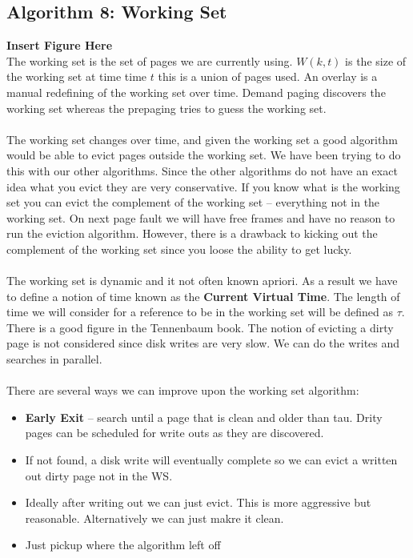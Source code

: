 \documentclass[../base_file/cs1550_notes.tex]{subfiles}
\begin{document}
\subsection{Algorithm 8: Working Set}
\textbf{Insert Figure Here}\\
The working set is the set of pages we are currently using.  $W(k,t)$ is the size of the working set at time time $t$ this is a union of pages
used.  An overlay is a manual redefining of the working set over time.  Demand paging discovers the working set whereas the prepaging tries to
guess the working set.\\\\
The working set changes over time, and given the working set a good algorithm would be able to evict pages outside the working set.  We have
been trying to do this with our other algorithms.  Since the other algorithms do not have an exact idea what you evict they are very conservative.
If you know what is the working set you can evict the complement of the working set -- everything not in the working set.  On next page fault
we will have free frames and have no reason to run the eviction algorithm.  However, there is a drawback to kicking out the complement of the
working set since you loose the ability to get lucky.\\\\
The working set is dynamic and it not often known apriori.  As a result we have to define a notion of time known as the \textbf{Current Virtual
Time}.  The length of time we will consider for a reference to be in the working set will be defined as $\tau$.  There is a good figure in the
Tennenbaum book.
The notion of evicting a dirty page is not considered since disk writes are very slow.  We can do the writes and searches in parallel.\\\\
There are several ways we can improve upon the working set algorithm:
\begin{itemize}
	\item \textbf{Early Exit} -- search until a page that is clean and older than tau.  Drity pages can be scheduled for write outs as they are
		discovered.
	\item If not found, a disk write will eventually complete so we can evict a written out dirty page not in the WS.
	\item Ideally after writing out we can just evict.  This is more aggressive but reasonable.  Alternatively we can just makre it clean.
	\item Just pickup where the algorithm left off
\end{itemize}
\end{document}
